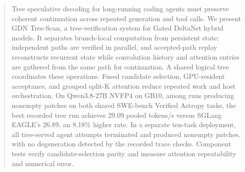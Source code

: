 \begin{abstract}
Tree speculative decoding for long-running coding agents must preserve coherent continuation across repeated generation and tool calls. We present GDN Tree-Scan, a tree-verification system for Gated DeltaNet hybrid models. It separates branch-local computation from persistent state: independent paths are verified in parallel, and accepted-path replay reconstructs recurrent state while convolution history and attention entries are gathered from the same path for continuation. A shared logical tree coordinates these operations. Fused candidate selection, GPU-resident acceptance, and grouped split-K attention reduce repeated work and host orchestration. On Qwen3.8-27B NVFP4 on GB10, among runs producing nonempty patches on both shared SWE-bench Verified Astropy tasks, the best recorded tree run achieves 29.09 pooled tokens/s versus SGLang EAGLE's 26.89, an 8.18\% higher rate. In a separate ten-task deployment, all tree-served agent attempts terminated and produced nonempty patches, with no degeneration detected by the recorded trace checks. Component tests verify candidate-selection parity and measure attention repeatability and numerical error.
\end{abstract}
